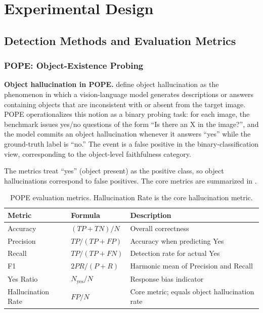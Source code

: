 \section{Experimental Design}

\subsection{Detection Methods and Evaluation Metrics}

\subsubsection{POPE: Object-Existence Probing}

\textbf{Object hallucination in POPE.}
\citet{liEvaluatingObjectHallucination2023} define object hallucination
as the phenomenon in which a vision-language model
generates descriptions or answers
containing objects that are inconsistent with
or absent from the target image.
POPE operationalizes this notion as a binary probing task:
for each image,
the benchmark issues yes/no questions
of the form ``Is there an X in the image?'',
and the model commits an object hallucination
whenever it answers ``yes''
while the ground-truth label is ``no.''
The event is a false positive in the binary-classification view,
corresponding to the object-level faithfulness category.

The metrics treat ``yes'' (object present) as the positive class,
so object hallucinations correspond to false positives.
The core metrics are summarized in .

\begin{table}[htbp]
  \centering
  \caption{POPE evaluation metrics.
    Hallucination Rate is the core hallucination metric.}
  \label{tab:pope_metrics}
  \small
  \begin{tabular}{lll}
    \toprule
    Metric & Formula & Description \\
    \midrule
    Accuracy          & $(TP+TN)/N$        & Overall correctness \\
    Precision         & $TP/(TP+FP)$       & Accuracy when predicting Yes \\
    Recall            & $TP/(TP+FN)$       & Detection rate for actual Yes \\
    F1                & $2PR/(P+R)$        & Harmonic mean of Precision and Recall \\
    Yes Ratio         & $N_{\text{yes}}/N$ & Response bias indicator \\
    Hallucination Rate & $FP/N$            & Core metric; equals object hallucination rate \\
    \bottomrule
  \end{tabular}
\end{table}

